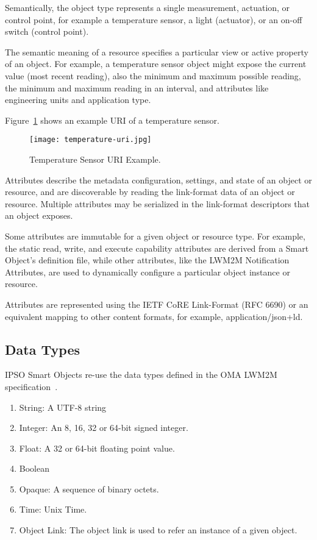\documentclass[peerreview, a4paper, 7pt]{IEEEtran}
\begin{document}
Semantically, the object type represents a single measurement, actuation, or control point, for example a temperature sensor, a light (actuator), or an on-off switch (control point).

The semantic meaning of a resource specifies a particular view or active property of an object. For example, a temperature sensor object might expose the current value (most recent reading), also the minimum and maximum possible reading, the minimum and maximum reading in an interval, and attributes like engineering units and application type.

Figure~\ref{temperature-uri-figure} shows an example URI of a temperature sensor. 

\begin{figure}[!t]
 \centering
 \texttt{[image: temperature-uri.jpg]}
 \caption{Temperature Sensor URI Example.}
 \label{temperature-uri-figure}
\end{figure}

Attributes describe the metadata configuration, settings, and state of an object or resource, and are discoverable by reading the link-format data of an object or resource. Multiple attributes may be serialized in the link-format descriptors that an object exposes. 

Some attributes are immutable for a given object or resource type. For example, the static read, write, and execute capability attributes are derived from a Smart Object's definition file, while other attributes, like the LWM2M Notification Attributes, are used to dynamically configure a particular object instance or resource.

Attributes are represented using the IETF CoRE Link-Format (RFC 6690) or an equivalent mapping to other content formats, for example, application/json+ld.

\subsection{Data Types}

IPSO Smart Objects re-use the data types defined in the OMA LWM2M specification~\cite{lwm2m}.

\begin{enumerate}
\item String: A UTF-8 string
\item Integer: An 8, 16, 32 or 64-bit signed integer.
\item Float: A 32 or 64-bit floating point value.
\item Boolean
\item Opaque: A sequence of binary octets.
\item Time: Unix Time.
\item Object Link: The object link is used to refer an instance of a given object. 
\end{enumerate}
\end{document}
